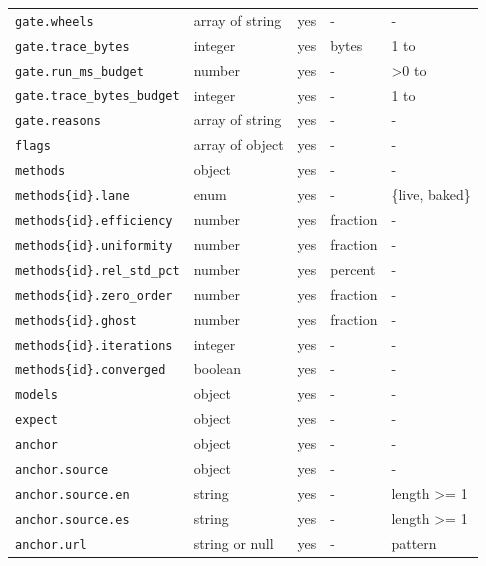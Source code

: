 \begin{longtable}{@{}l l c l l@{}}
\texttt{gate.wheels} & array of string & yes & - & -\\
\texttt{gate.trace\_bytes} & integer & yes & bytes & 1 to\\
\texttt{gate.run\_ms\_budget} & number & yes & - & >0 to\\
\texttt{gate.trace\_bytes\_budget} & integer & yes & - & 1 to\\
\texttt{gate.reasons} & array of string & yes & - & -\\
\texttt{flags} & array of object & yes & - & -\\
\texttt{methods} & object & yes & - & -\\
\texttt{methods\{id\}.lane} & enum & yes & - & \{live, baked\}\\
\texttt{methods\{id\}.efficiency} & number & yes & fraction & -\\
\texttt{methods\{id\}.uniformity} & number & yes & fraction & -\\
\texttt{methods\{id\}.rel\_std\_pct} & number & yes & percent & -\\
\texttt{methods\{id\}.zero\_order} & number & yes & fraction & -\\
\texttt{methods\{id\}.ghost} & number & yes & fraction & -\\
\texttt{methods\{id\}.iterations} & integer & yes & - & -\\
\texttt{methods\{id\}.converged} & boolean & yes & - & -\\
\texttt{models} & object & yes & - & -\\
\texttt{expect} & object & yes & - & -\\
\texttt{anchor} & object & yes & - & -\\
\texttt{anchor.source} & object & yes & - & -\\
\texttt{anchor.source.en} & string & yes & - & length >= 1\\
\texttt{anchor.source.es} & string & yes & - & length >= 1\\
\texttt{anchor.url} & string or null & yes & - & pattern\\
\bottomrule\end{longtable}
\endgroup

